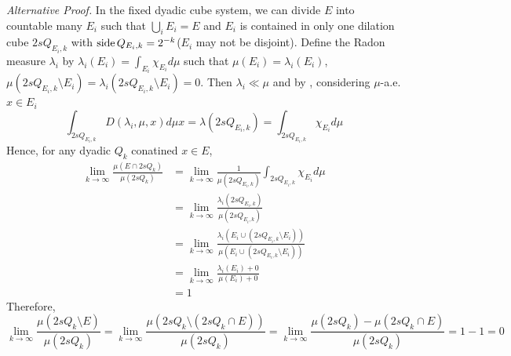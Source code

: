 \textit{Alternative Proof.} In the fixed dyadic cube system, we can divide $E$ into countable many $E_i$ such that $\bigcup_i E_i = E$ and $E_i$ is contained in only one dilation cube $2sQ_{E_i, k}$ with $\operatorname{side} Q_{E_i, k} = 2^{-k}$($E_i$ may not be disjoint).  Define the Radon measure $\lambda_i$ by $\lambda_i(E_i) = \int_{E_i} \chi_{E_i} d \mu$ such that $\mu(E_i) = \lambda_i(E_i)$, $\mu(2sQ_{E_i, k}\setminus E_i) = \lambda_i(2sQ_{E_i, k}\setminus E_i) = 0$. Then $\lambda_i \ll \mu$ and by {\cite[Theorem 2.12(2)]{mattila1999geometry}}, considering $\mu$-a.e. $x\in E_i$
\begin{equation*}
    \int_{2sQ_{E_i, k}} D(\lambda_i, \mu, x)d\mu x = \lambda(2sQ_{E_i, k}) = \int_{2sQ_{E_i, k}} \chi_{E_i} d\mu
\end{equation*}
Hence, for any dyadic $Q_k$ conatined $x\in E$,
\begin{equation*}
    \begin{split}
        \lim_{k\rightarrow\infty} \frac{\mu(E\cap 2sQ_k)}{\mu(2sQ_k)} &=
        \lim_{k\rightarrow \infty} \frac{1}{\mu(2sQ_{E_i, k})}\int_{2sQ_{E_i, k}} \chi_{E_i} d\mu \\
        &= \lim_{k\rightarrow \infty} \frac{\lambda_i(2sQ_{E_i, k})}{\mu(2sQ_{E_i, k})} \\
        &= \lim_{k\rightarrow\infty} \frac{\lambda_i(E_i\cup (2sQ_{E_i,k}\setminus E_i))}{\mu(E_i\cup (2sQ_{E_i,k}\setminus E_i))} \\
        &= \lim_{k\rightarrow\infty} \frac{\lambda_i(E_i) +0}{\mu(E_i) +0} \\ 
        &= 1
    \end{split}
\end{equation*}
Therefore, 
\begin{equation*}
    \lim_{k\rightarrow\infty} \frac{\mu(2sQ_k\setminus E)}{\mu(2sQ_k)} = \lim_{k\rightarrow\infty} \frac{\mu(2sQ_k\setminus (2sQ_k\cap E))}{\mu(2sQ_k)} = \lim_{k\rightarrow\infty} \frac{\mu(2sQ_k)-\mu(2sQ_k\cap E)}{\mu(2sQ_k)} = 1 - 1 = 0
\end{equation*}


